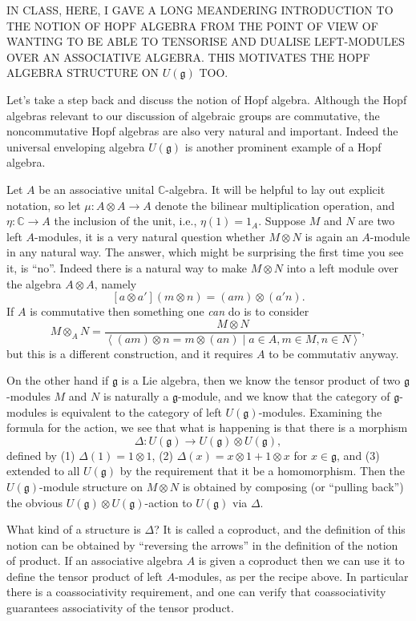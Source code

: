\documentclass[12pt]{article}
\theoremstyle{plain}
\theoremstyle{definition}
\numberwithin{equation}{section}
\newcommand{\D}{\Delta}
\newcommand{\C}{\mathbb{C}}
\newcommand{\g}{\mathfrak{g}}
\begin{document}
{\color{blue}IN CLASS, HERE, I GAVE A LONG MEANDERING INTRODUCTION TO THE NOTION OF HOPF ALGEBRA FROM THE POINT OF VIEW OF WANTING TO BE ABLE TO TENSORISE AND DUALISE LEFT-MODULES OVER AN ASSOCIATIVE ALGEBRA. THIS MOTIVATES THE HOPF ALGEBRA STRUCTURE ON $U(\g)$ TOO.

Let's take a step back and discuss the notion of Hopf algebra. Although the Hopf algebras relevant to our discussion of algebraic groups are commutative, the noncommutative Hopf algebras are also very natural and important. Indeed the universal enveloping algebra $U(\g)$ is another prominent example of a Hopf algebra.

Let $A$ be an associative unital $\C$-algebra. It will be helpful to lay out explicit notation, so let $\mu : A \otimes A \rightarrow A$ denote the bilinear multiplication operation, and $\eta : \C \rightarrow A$ the inclusion of the unit, i.e., $\eta(1) = 1_A$. Suppose $M$ and $N$ are two left $A$-modules, it is a very natural question whether $M \otimes N$ is again an $A$-module in any natural way. The answer, which might be surprising the first time you see it, is ``no''. Indeed there is a natural way to make $M \otimes N$ into a left module over the algebra $A \otimes A$, namely
\[
[a \otimes a'](m \otimes n) = (am) \otimes (a'n).
\]
If $A$ is commutative then something one \emph{can} do is to consider
\[
M \otimes_A N = \frac{M \otimes N}{\left<(am)\otimes n = m \otimes (an) \mid a \in A, m \in M, n \in N \right>},
\]
but this is a different construction, and it requires $A$ to be commutativ anyway.

On the other hand if $\g$ is a Lie algebra, then we know the tensor product of two $\g$-modules $M$ and $N$ is naturally a $\g$-module, and we know that the category of $\g$-modules is equivalent to the category of left $U(\g)$-modules. Examining the formula for the action, we see that what is happening is that there is a morphism
\[
\D : U(\g) \rightarrow U(\g) \otimes U(\g),
\]
defined by (1) $\D(1) = 1 \otimes 1$, (2) $\D(x) = x \otimes 1 + 1 \otimes x$ for $x \in \g$, and (3) extended to all $U(\g)$ by the requirement that it be a homomorphism. Then the $U(\g)$-module structure on $M \otimes N$ is obtained by composing (or ``pulling back'') the obvious $U(\g) \otimes U(\g)$-action to $U(\g)$ via $\D$.

What kind of a structure is $\D$? It is called a coproduct, and the definition of this notion can be obtained by ``reversing the arrows'' in the definition of the notion of product. If an associative algebra $A$ is given a coproduct then we can use it to define the tensor product of left $A$-modules, as per the recipe above. In particular there is a coassociativity requirement, and one can verify that coassociativity guarantees associativity of the tensor product.

}
\end{document}
